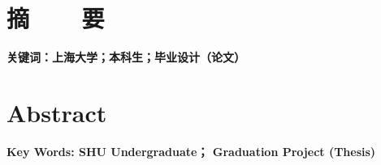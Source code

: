 %
%

\topskip=0pt

\vspace*{-7mm}

\begin{center}
  \heiti{}\textbf{\thesisTitle}
\end{center}

\vspace*{2mm}

{\let\clearpage\relax \chapter*{\textmd{摘~~~~要}}}
\setcounter{page}{1}

\vspace*{1mm}

\setlength{\parskip}{0em}

\zhlipsum[1-2]

\vspace{4ex}\noindent\textbf{\heiti 关键词：上海大学；本科生；毕业设计（论文）}
\newpage

\topskip=0pt

\vspace*{2mm}

\begin{spacing}{0.95}
  \centering
  \heiti{}\textbf{\thesisTitleEN}
\end{spacing}

\vspace*{17mm}

{\let\clearpage\relax \chapter*{
  \textmd{Abstract}\vskip -3bp}}
\setcounter{page}{2}

\setlength{\parskip}{0em}

\lipsum[1]

\vspace{3ex}\noindent\textbf{Key Words: SHU Undergraduate； Graduation Project (Thesis)}
\newpage
